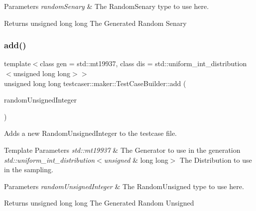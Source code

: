 \begin{DoxyParams}{Parameters}
{\em random\+Senary} & The Random\+Senary type to use here. \\
\hline
\end{DoxyParams}
\begin{DoxyReturn}{Returns}
unsigned long long The Generated Random Senary 
\end{DoxyReturn}
\mbox{\label{classtestcaser_1_1maker_1_1TestCaseBuilder_a31403b4d313d7e3933252bcd89e4a060}} 
\subsubsection{\texorpdfstring{add()}{add()}\hspace{0.1cm}{\footnotesize\ttfamily [10/11]}}
{\footnotesize\ttfamily template$<$class gen  = std\+::mt19937, class dis  = std\+::uniform\+\_\+int\+\_\+distribution$<$unsigned long long$>$$>$ \\
unsigned long long testcaser\+::maker\+::\+Test\+Case\+Builder\+::add (\begin{DoxyParamCaption}\item[{\mbox{\hyperlink{classtestcaser_1_1maker_1_1types_1_1RandomUnsignedInteger}{types\+::\+Random\+Unsigned\+Integer}}$<$ gen, dis $>$ \&}]{random\+Unsigned\+Integer }\end{DoxyParamCaption})\hspace{0.3cm}{\ttfamily [inline]}}



Adds a new Random\+Unsigned\+Integer to the testcase file. 


\begin{DoxyTemplParams}{Template Parameters}
{\em std\+::mt19937} & The Generator to use in the generation \\
\hline
{\em std\+::uniform\+\_\+int\+\_\+distribution$<$unsigned} & long long$>$ The Distribution to use in the sampling. \\
\hline
\end{DoxyTemplParams}

\begin{DoxyParams}{Parameters}
{\em random\+Unsigned\+Integer} & The Random\+Unsigned type to use here. \\
\hline
\end{DoxyParams}
\begin{DoxyReturn}{Returns}
unsigned long long The Generated Random Unsigned 
\end{DoxyReturn}
\mbox{\label{classtestcaser_1_1maker_1_1TestCaseBuilder_a9c3e973820d032cce82ab0d070c700f9}} 
